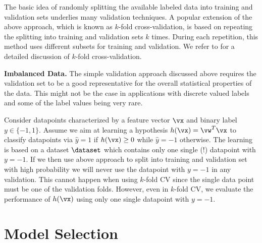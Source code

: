 \documentclass[12pt]{report}
\begin{document}

The basic idea of randomly splitting the available labeled data into training and 
validation sets underlies many validation techniques. A popular extension 
of the above approach, which is known as $k$-fold cross-validation, is based 
on repeating the splitting into training and validation sets $k$ times. During 
each repetition, this method uses different subsets for training and validation. 
We refer to \cite[Sec. 7.10]{hastie01statisticallearning} for a detailed discussion of $k$-fold 
cross-validation. 

{\bf Imbalanced Data.} 
The simple validation approach discussed above requires the validation set to be 
a good representative for the overall statistical properties of the data. This might 
not be the case in applications with discrete valued labels and some of the label 
values being very rare. 

Consider datapoints characterized by a feature vector $\vx$ and binary label $y \in \{-1,1\}$. 
Assume we aim at learning a hypothesis $h(\vx) = \vw^{T} \vx$ to classify datapoints 
via $\hat{y}=1$ if $h(\vx) \geq 0$ while $\hat{y}=-1$ otherwise. The learning is based 
on a dataset $\dataset$ which contains only one single (!) datapoint with $y=-1$. If 
we then use above approach to split into training and validation set with high probability we will 
never use the datapoint with $y=-1$ in any validation. This cannot happen when using 
$k$-fold CV since the single data point must be one of the validation folds. However, 
even in $k$-fold CV, we evaluate the performance of $h(\vx)$ using only one single 
datapoint with $y=-1$. 


\section{Model Selection}
\label{sec_modsel}
\end{document}
